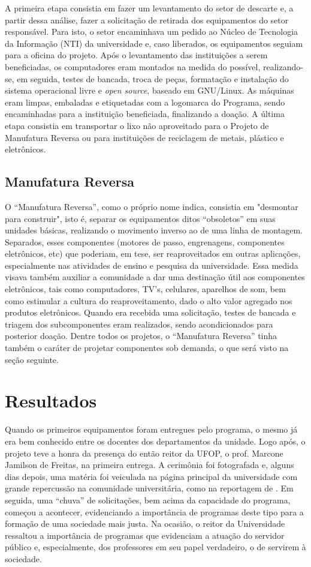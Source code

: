\documentclass[a4paper]{ifacconf}
\begin{document}
A primeira etapa consistia em fazer um levantamento do setor de descarte e, a partir dessa análise, fazer a solicitação de retirada dos equipamentos do setor responsável. Para isto, o setor encaminhava um pedido ao Núcleo de Tecnologia da Informação (NTI) da universidade e, caso liberados, os equipamentos seguiam para a oficina do projeto. Após o levantamento das instituições a serem beneficiadas, os computadores eram montados na medida do possível, realizando-se, em seguida, testes de bancada, troca de peças, formatação e instalação do sistema operacional livre e \emph{open source}, baseado em GNU/Linux. As máquinas eram limpas, embaladas e etiquetadas com a logomarca do Programa, sendo encaminhadas para a instituição beneficiada, finalizando a doação. A última etapa consistia em transportar o lixo não aproveitado para o Projeto de Manufatura Reversa ou para instituições de reciclagem de metais, plástico e eletrônicos.

\subsection{Manufatura Reversa}
O ``Manufatura Reversa'', como o próprio nome indica, consistia em "desmontar para construir", isto é, separar os equipamentos ditos ``obsoletos'' em suas unidades básicas, realizando o movimento inverso ao de uma linha de montagem. Separados, esses componentes (motores de passo, engrenagens, componentes eletrônicos, etc) que poderiam, em tese, ser reaproveitados em outras aplicações, especialmente nas atividades de ensino e pesquisa da universidade. Essa medida visava também auxiliar a comunidade a dar uma destinação útil aos componentes eletrônicos, tais como computadores, TV's, celulares, aparelhos de som, bem como estimular a cultura do reaproveitamento, dado o alto valor agregado nos produtos eletrônicos. Quando era recebida uma solicitação, testes de bancada e triagem dos subcomponentes eram realizados, sendo acondicionados para posterior doação. Dentre todos os projetos, o ``Manufatura Reversa'' tinha também o caráter de projetar componentes sob demanda, o que será visto na seção seguinte.

\section{Resultados}
%
Quando os primeiros equipamentos foram entregues pelo programa, o mesmo já era bem conhecido entre os docentes dos departamentos da unidade. Logo após, o projeto teve a honra da presença do então reitor da UFOP, o prof. Marcone Jamilson de Freitas, na primeira entrega. A cerimônia foi fotografada e, alguns dias depois, uma matéria foi veiculada na página principal da universidade \citep{ufop2016} com grande repercussão na comunidade universitária, como na reportagem de \cite{lamparina}. Em seguida, uma ``chuva'' de solicitações, bem acima da capacidade do programa, começou a acontecer, evidenciando a importância de programas deste tipo para a formação de uma sociedade mais justa. Na ocasião, o reitor da Universidade ressaltou a importância de programas que evidenciam a atuação do servidor público e, especialmente, dos professores em seu papel verdadeiro, o de servirem à sociedade.
\end{document}

